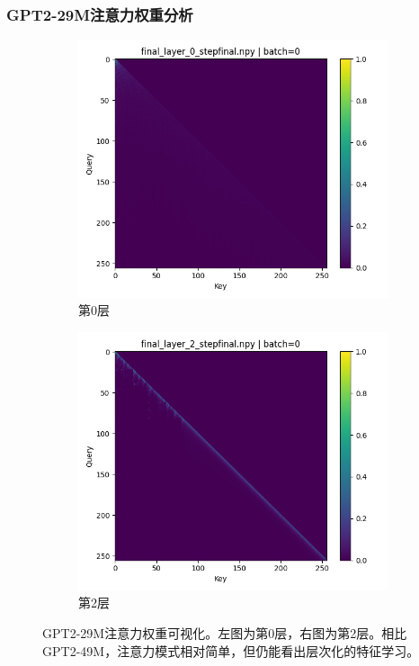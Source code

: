 \documentclass{article}
\begin{document}
\subsubsection{GPT2-29M注意力权重分析}
\begin{figure}[H]
\centering
\begin{subfigure}[b]{0.45\textwidth}
\includegraphics[width=\textwidth]{../visualize/attentions/GPT2-29M/final_layer_0_stepfinal_b0.png}
\caption{第0层}
\label{fig:attn_29m_l0_b0}
\end{subfigure}
\hfill
\begin{subfigure}[b]{0.45\textwidth}
\includegraphics[width=\textwidth]{../visualize/attentions/GPT2-29M/final_layer_2_stepfinal_b0.png}
\caption{第2层}
\label{fig:attn_29m_l2_b0}
\end{subfigure}
\caption{GPT2-29M注意力权重可视化。左图为第0层，右图为第2层。相比GPT2-49M，注意力模式相对简单，但仍能看出层次化的特征学习。}
\label{fig:attn_29m_comparison}
\end{figure}
\end{document}
